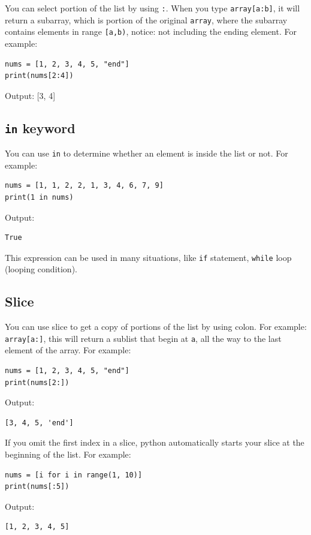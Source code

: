 \documentclass[12pt]{book}
\begin{document}
You can select portion of the list by using \texttt{:}. When you type \texttt{array[a:b]}, it will return a subarray, which is portion of the original \texttt{array}, where the subarray contains elements in range \texttt{[a,b)}, notice: not including the ending element. For example:
\begin{verbatim}
nums = [1, 2, 3, 4, 5, "end"]
print(nums[2:4])
\end{verbatim}
Output:
[3, 4]
\subsection{\texttt{in} keyword}
\label{sec:org0eb6f1e}
You can use \texttt{in} to determine whether an element is inside the list or not. For example:
\begin{verbatim}
nums = [1, 1, 2, 2, 1, 3, 4, 6, 7, 9]
print(1 in nums)
\end{verbatim}
Output:
\begin{verbatim}
True
\end{verbatim}

This expression can be used in many situations, like \texttt{if} statement, \texttt{while} loop (looping condition).

\subsection{Slice}
\label{sec:org93e8e15}
You can use slice to get a copy of portions of the list by using colon. For example: \texttt{array[a:]}, this will return a sublist that begin at \texttt{a}, all the way to the last element of the array. For example:
\begin{verbatim}
nums = [1, 2, 3, 4, 5, "end"]
print(nums[2:])
\end{verbatim}
Output:
\begin{verbatim}
[3, 4, 5, 'end']
\end{verbatim}

If you omit the first index in a slice, python automatically starts your slice at the beginning of the list. For example:
\begin{verbatim}
nums = [i for i in range(1, 10)]
print(nums[:5])
\end{verbatim}
Output:
\begin{verbatim}
[1, 2, 3, 4, 5]
\end{verbatim}
\end{document}
